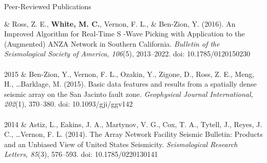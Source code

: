 \begin{rSection}{Peer-Reviewed Publications}
\begin{timeline}
		& Ross, Z. E., \textbf{White, M. C.}, Vernon, F. L., \& Ben‐Zion, Y. (2016). An Improved Algorithm for Real‐Time S ‐Wave Picking with Application to the (Augmented) ANZA Network in Southern California. \textit{Bulletin of the Seismological Society of America, 106}(5), 2013–2022. doi: 10.1785/0120150230 \\ \\
		
		2015 & Ben-Zion, Y., Vernon, F. L., Ozakin, Y., Zigone, D., Ross, Z. E., Meng, H., \dots Barklage, M. (2015). Basic data features and results from a spatially dense seismic array on the San Jacinto fault zone. \textit{Geophysical Journal International, 202}(1), 370–380. doi: 10.1093/gji/ggv142 \\ \\         
		
		2014 & Astiz, L., Eakins, J. A., Martynov, V. G., Cox, T. A., Tytell, J., Reyes, J. C., \dots Vernon, F. L. (2014). The Array Network Facility Seismic Bulletin: Products and an Unbiased View of United States Seismicity. \textit{Seismological Research Letters, 85}(3), 576–593. doi: 10.1785/0220130141
		
	\end{timeline}
\end{rSection}